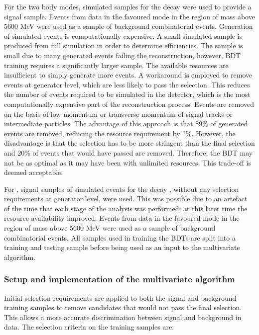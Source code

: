 For the two body modes, simulated samples for the decay \kpi were used to provide a signal sample. Events from data in the favoured \kpi mode in the region of \Bm mass above 5600 MeV were used as a sample of background combinatorial events. Generation of simulated events is computationally expensive. A small simulated sample is produced from full \lhcb simulation in order to determine efficiencies. The sample is small due to many generated events failing the reconstruction, however, BDT training requires a significantly larger sample. The available resources are insufficient to simply generate more events. A workaround is employed to remove events at generator level, which are less likely to pass the selection. This reduces the number of events required to be simulated in the \lhcb detector, which is the most computationally expensive part of the reconstruction process. Events are removed on the basis of low momentum or transverse momentum of signal tracks or intermediate particles. The advantage of this approach is that 89\% of generated events are removed, reducing the resource requirement by ?\%. However, the disadvantage is that the selection has to be more stringent than the final selection and 20\% of events that would have passed are removed. Therefore, the BDT may not be as optimal as it may have been with unlimited resources. This trade-off is deemed acceptable.

For \kpipipi, signal samples of simulated events for the decay \kpipipi, without any selection requirements at generator level, were used. This was possible due to an artefact of the time that each stage of the analysis was performed; at this later time the resource availability improved. Events from data in the favoured \kpipipi mode in the region of \Bm mass above 5600 MeV were used as a sample of background combinatorial events. All samples used in training the BDTs are split into a training and testing sample before being used as an input to the multivariate algorithm.

\subsubsection{Setup and implementation of the multivariate algorithm}

Initial selection requirements are applied to both the signal and background training samples to remove candidates that would not pass the final selection. This allows a more accurate discrimination between signal and background in data. The selection criteria on the training samples are:

